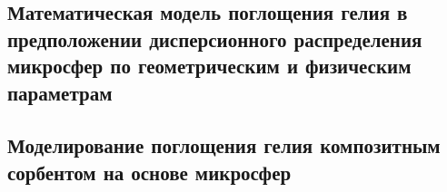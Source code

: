 %
%
%
%
%


\subsection{Математическая модель поглощения гелия в предположении дисперсионного распределения микросфер по геометрическим и физическим параметрам}
\subsection{Моделирование поглощения гелия композитным сорбентом на основе микросфер}


